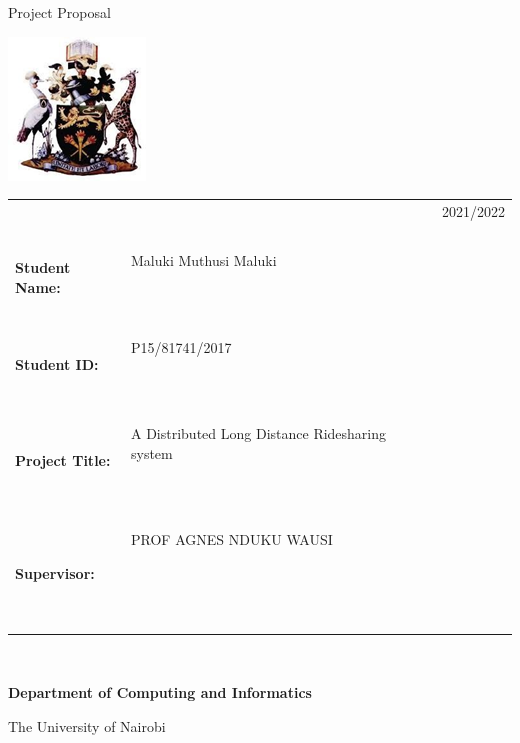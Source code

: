 \begin{center}
    Project Proposal
\end{center}

\begin{center}
    \includegraphics[scale=1]{uon.png}
\end{center}

{\vspace{7em}}

\begin{center}
    \begin{tabular}{|lp{5.0cm}lll|}
        \hline
                                &                        &  &   & {\small{2021/2022}} \\
                                &                        &  &   &                     \\
                                &                        &  &   &                     \\
        \textbf{Student Name:}  & Maluki Muthusi Maluki

        \                       &                        &  &                         \\
        \textbf{Student ID:}    & P15/81741/2017

        \                       &                        &  &                         \\
        \textbf{Project Title:} &
        A Distributed Long Distance Ridesharing system

        \                       &                        &  &                         \\
        \textbf{Supervisor:}    & PROF AGNES NDUKU WAUSI


        \

        \                       &                        &  &                         \\
        \hline
    \end{tabular}
\end{center}

\

{\vspace{7em}}

\begin{center}
    \Huge{{\textbf{Department of Computing and Informatics}}}
\end{center}

{\medskip}

\begin{center}
    The University of Nairobi
\end{center}